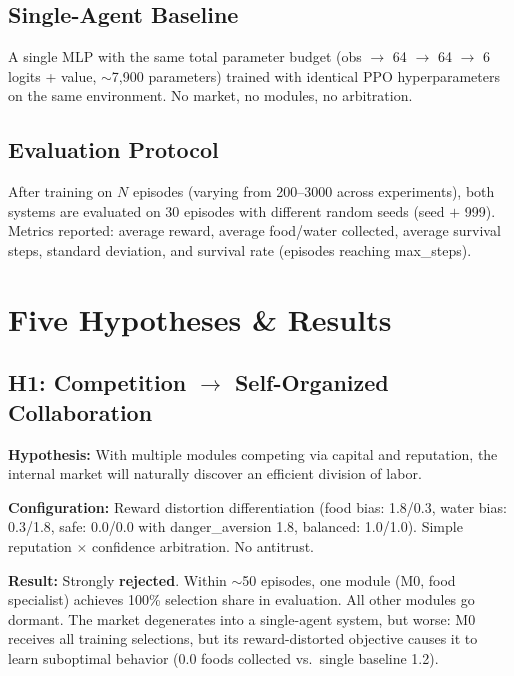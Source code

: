 \documentclass[a4paper,11pt]{article}
\begin{document}
\subsection{Single-Agent Baseline}

A single MLP with the same total parameter budget (obs $\rightarrow$ 64 $\rightarrow$ 64 $\rightarrow$ 6 logits + value, $\sim$7,900 parameters) trained with identical PPO hyperparameters on the same environment. No market, no modules, no arbitration.

\subsection{Evaluation Protocol}

After training on $N$ episodes (varying from 200--3000 across experiments), both systems are evaluated on 30 episodes with different random seeds (seed $+$ 999). Metrics reported: average reward, average food/water collected, average survival steps, standard deviation, and survival rate (episodes reaching max\_steps).

\section{Five Hypotheses \& Results}

\subsection{H1: Competition $\rightarrow$ Self-Organized Collaboration}

\textbf{Hypothesis:} With multiple modules competing via capital and reputation, the internal market will naturally discover an efficient division of labor.

\textbf{Configuration:} Reward distortion differentiation (food bias: 1.8/0.3, water bias: 0.3/1.8, safe: 0.0/0.0 with danger\_aversion 1.8, balanced: 1.0/1.0). Simple reputation $\times$ confidence arbitration. No antitrust.

\textbf{Result:} Strongly \textbf{rejected}. Within $\sim$50 episodes, one module (M0, food specialist) achieves 100\% selection share in evaluation. All other modules go dormant. The market degenerates into a single-agent system, but worse: M0 receives all training selections, but its reward-distorted objective causes it to learn suboptimal behavior (0.0 foods collected vs.\ single baseline 1.2).
\end{document}
